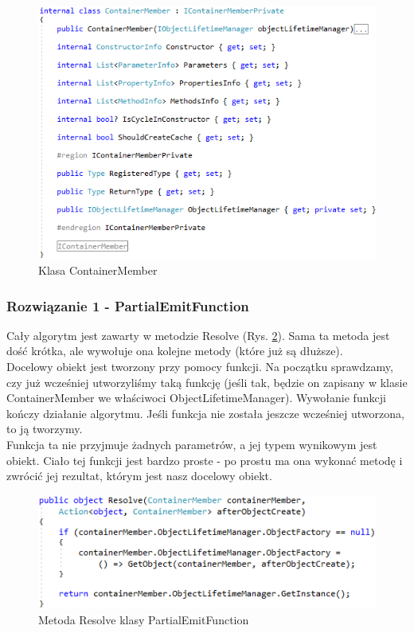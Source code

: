 \documentclass[12pt]{article}
\begin{document}
\begin{figure}[h]
	\begin{center}
  		\includegraphics{ContainerMember.png}
  		\caption{Klasa ContainerMember}
  		\label{fig:ContainerMember}
	\end{center}
\end{figure}

\subsubsection{Rozwiązanie 1 - PartialEmitFunction}
Cały algorytm jest zawarty w metodzie Resolve (Rys. \ref{fig:PartialEmitFunction_Resolve}). Sama ta metoda jest dość krótka, ale wywołuje ona kolejne metody (które już są dłuższe).\\
Docelowy obiekt jest tworzony przy pomocy funkcji. Na początku sprawdzamy, czy już wcześniej utworzyliśmy taką funkcję (jeśli tak, będzie on zapisany w klasie ContainerMember we właściwoci ObjectLifetimeManager). Wywołanie funkcji kończy działanie algorytmu. Jeśli funkcja nie została jeszcze wcześniej utworzona, to ją tworzymy.\\
Funkcja ta nie przyjmuje żadnych parametrów, a jej typem wynikowym jest obiekt. Ciało tej funkcji jest bardzo proste - po prostu ma ona wykonać metodę i zwrócić jej rezultat, którym jest nasz docelowy obiekt.\\
\begin{figure}[H]
	\begin{center}
  		\includegraphics{PartialEmitFunction_Resolve.png}
  		\caption{Metoda Resolve klasy PartialEmitFunction}
  		\label{fig:PartialEmitFunction_Resolve}
	\end{center}
\end{figure}
\end{document}
